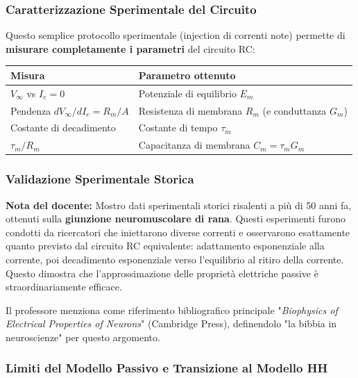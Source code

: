 \subsubsection{Caratterizzazione Sperimentale del Circuito}

Questo semplice protocollo sperimentale (injection di correnti note) permette di \textbf{misurare completamente i parametri} del circuito RC:

\begin{table}[htbp]
    \centering
    \renewcommand{\arraystretch}{1.3}
    \begin{tabularx}{\textwidth}{|l|X|}
    \hline
    \textbf{Misura} & \textbf{Parametro ottenuto} \\
    \hline
    $V_\infty$ vs $I_e = 0$ & Potenziale di equilibrio $E_m$ \\
    Pendenza $dV_\infty / dI_e = R_m/A$ & Resistenza di membrana $R_m$ (e conduttanza $G_m$) \\
    Costante di decadimento & Costante di tempo $\tau_m$ \\
    $\tau_m / R_m$ & Capacitanza di membrana $C_m = \tau_m G_m$ \\
    \hline
    \end{tabularx}
\end{table}

\subsubsection{Validazione Sperimentale Storica}

\begin{tcolorbox}[colback=gray!5, colframe=gray!40, arc=2mm, boxrule=0.5pt]
\textbf{Nota del docente:} Mostro dati sperimentali storici risalenti a più di 50 anni fa, ottenuti sulla \textbf{giunzione neuromuscolare di rana}. Questi esperimenti furono condotti da ricercatori che iniettarono diverse correnti e osservarono esattamente quanto previsto dal circuito RC equivalente: adattamento esponenziale alla corrente, poi decadimento esponenziale verso l'equilibrio al ritiro della corrente. Questo dimostra che l'approssimazione delle proprietà elettriche passive è straordinariamente efficace.
\end{tcolorbox}

Il professore menziona come riferimento bibliografico principale "\textit{Biophysics of Electrical Properties of Neurons}" (Cambridge Press), definendolo "la bibbia in neuroscienze" per questo argomento.

\subsubsection{Limiti del Modello Passivo e Transizione al Modello HH}

